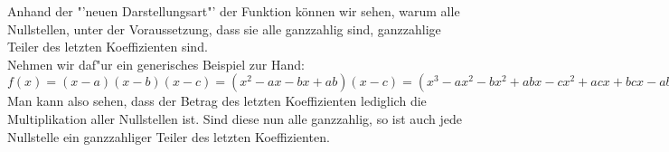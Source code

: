 Anhand der "'neuen Darstellungsart"' der Funktion können wir sehen, warum alle Nullstellen, unter der Voraussetzung, dass sie alle ganzzahlig sind, ganzzahlige Teiler des letzten Koeffizienten sind.\\
Nehmen wir daf"ur ein generisches Beispiel zur Hand:\\
$f(x)=(x-a)(x-b)(x-c)=(x^2 - ax - bx + ab)(x-c)=(x^3 - ax^2 - bx^2 + abx - cx^2 + acx + bcx - abc)$\\
Man kann also sehen, dass der Betrag des letzten Koeffizienten lediglich die Multiplikation aller Nullstellen ist. Sind diese nun alle ganzzahlig, so ist auch jede Nullstelle ein ganzzahliger Teiler des letzten Koeffizienten.